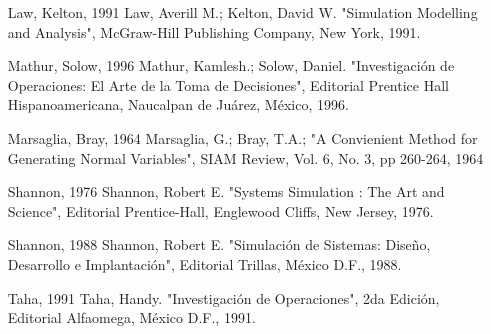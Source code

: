 \begin{itemize}
\item
[Law, Kelton, 1991]
Law, Averill M.; Kelton, David W. "Simulation Modelling and Analysis", McGraw-Hill Publishing Company, New York, 1991.

\item
[Mathur, Solow, 1996]
Mathur, Kamlesh.; Solow, Daniel. "Investigación de Operaciones: El Arte de la Toma de Decisiones", Editorial Prentice Hall Hispanoamericana, Naucalpan de Juárez, México, 1996.

\item
[Marsaglia, Bray, 1964]
Marsaglia, G.; Bray, T.A.; "A Convienient Method for Generating Normal Variables", SIAM Review, Vol. 6, No. 3, pp 260-264, 1964

\item
[Shannon, 1976]
Shannon, Robert E. "Systems Simulation : The Art and Science", Editorial Prentice-Hall, Englewood Cliffs, New Jersey, 1976.

\item
[Shannon, 1988]
Shannon, Robert E. "Simulación de Sistemas: Diseño, Desarrollo e Implantación", Editorial Trillas, México D.F., 1988.

\item
[Taha, 1991]
Taha, Handy. "Investigación de Operaciones", 2da Edición, Editorial Alfaomega, México D.F., 1991.

\end{itemize}

